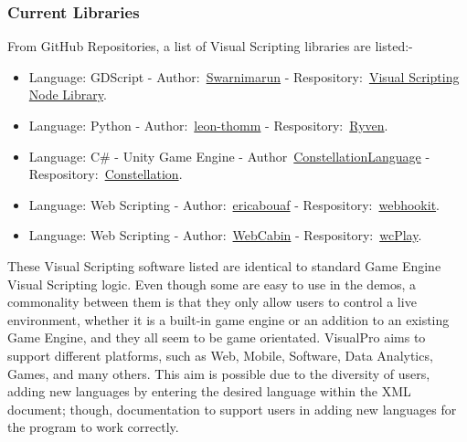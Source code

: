 \documentclass[conference]{IEEEtran}
\begin{document}
        \subsubsection{Current Libraries}
          From GitHub Repositories, a list of Visual Scripting libraries are listed:-
          \begin{itemize}
            \item Language: GDScript - Author:~\href{https://github.com/swarnimarun}{Swarnimarun} - Respository:~\href{https://github.com/swarnimarun/visual-scripting-node-library}{Visual Scripting Node Library}.
            \item Language: Python - Author:~\href{https://github.com/leon-thomm}{leon-thomm} - Respository:~\href{https://github.com/leon-thomm/Ryven}{Ryven}.
            \item Language: C\# - Unity Game Engine - Author~\href{https://github.com/ConstellationLanguage}{ConstellationLanguage} - Respository:~\href{https://github.com/ConstellationLanguage/Constellation}{Constellation}.
            \item Language: Web Scripting - Author:~\href{https://github.com/ericabouaf}{ericabouaf} - Respository:~\href{https://github.com/ericabouaf/webhookit}{webhookit}.
            \item Language: Web Scripting - Author:~\href{https://github.com/WebCabin}{WebCabin} - Respository:~\href{https://github.com/WebCabin/wcPlay}{wcPlay}.
          \end{itemize}

          These Visual Scripting software listed are identical to standard Game Engine Visual Scripting logic. Even though some are easy to use in the demos, a commonality between them is that they only allow users to control a live environment, whether it is a built-in game engine or an addition to an existing Game Engine, and they all seem to be game orientated. VisualPro aims to support different platforms, such as Web, Mobile, Software, Data Analytics, Games, and many others. This aim is possible due to the diversity of users, adding new languages by entering the desired language within the XML document; though, documentation to support users in adding new languages for the program to work correctly.
\end{document}
